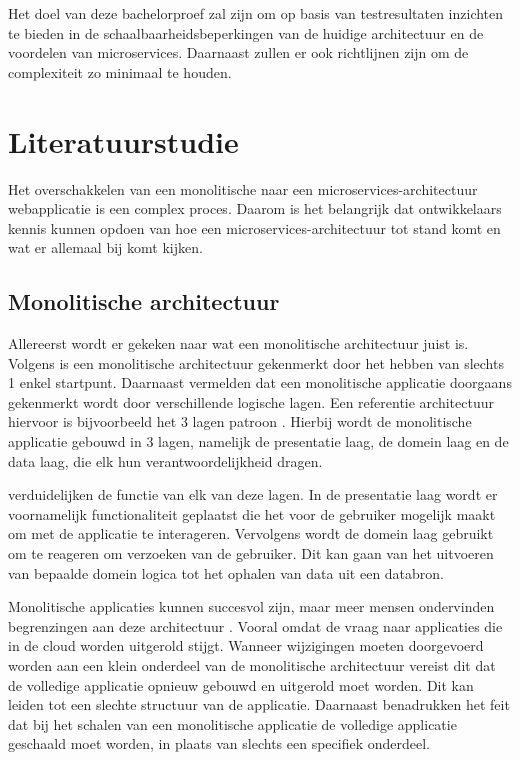 Het doel van deze bachelorproef zal zijn om op basis van testresultaten inzichten te bieden in de schaalbaarheidsbeperkingen van de huidige architectuur en de voordelen van microservices. Daarnaast zullen er ook richtlijnen zijn om de complexiteit zo minimaal te houden.


\section{Literatuurstudie}%
\label{sec:literatuurstudie}

Het overschakkelen van een monolitische naar een microservices-architectuur webapplicatie is een complex proces. Daarom is het belangrijk dat ontwikkelaars kennis kunnen opdoen van hoe een microservices-architectuur tot stand komt en wat er allemaal bij komt kijken.

\subsection{Monolitische architectuur}

Allereerst wordt er gekeken naar wat een monolitische architectuur juist is. Volgens \textcite{Velepucha2023} is een monolitische architectuur gekenmerkt door het hebben van slechts 1 enkel startpunt. Daarnaast vermelden \textcite{Velepucha2023} dat een monolitische applicatie doorgaans gekenmerkt wordt door verschillende logische lagen. Een referentie architectuur hiervoor is bijvoorbeeld het 3 lagen patroon \autocite{Velepucha2023}. Hierbij wordt de monolitische applicatie gebouwd in 3 lagen, namelijk de presentatie laag, de domein laag en de data laag, die elk hun verantwoordelijkheid dragen.

\textcite{Blinowski2022} verduidelijken de functie van elk van deze lagen. In de presentatie laag wordt er voornamelijk functionaliteit geplaatst die het voor de gebruiker mogelijk maakt om met de applicatie te interageren. Vervolgens wordt de domein laag gebruikt om te reageren om verzoeken van de gebruiker. Dit kan gaan van het uitvoeren van bepaalde domein logica tot het ophalen van data uit een databron.

Monolitische applicaties kunnen succesvol zijn, maar meer mensen ondervinden begrenzingen aan deze architectuur \autocite{Lewis2014}. Vooral omdat de vraag naar applicaties die in de cloud worden uitgerold stijgt. Wanneer wijzigingen moeten doorgevoerd worden aan een klein onderdeel van de monolitische architectuur vereist dit dat de volledige applicatie opnieuw gebouwd en uitgerold moet worden. Dit kan leiden tot een slechte structuur van de applicatie. Daarnaast benadrukken \textcite{Lewis2014} het feit dat bij het schalen van een monolitische applicatie de volledige applicatie geschaald moet worden, in plaats van slechts een specifiek onderdeel.

